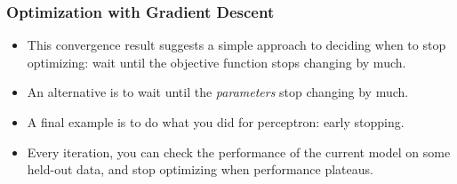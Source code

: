 \documentclass[trans]{beamer}
\begin{document}

\begin{frame}
  \frametitle{Optimization with Gradient Descent}
\begin{itemize}
\item
This convergence result suggests a simple approach to deciding when to
stop optimizing: wait until the objective function stops changing by
much.  
\item An alternative is to wait until the \emph{parameters} stop
changing by much. 
\item A final example is to do what you did for
perceptron: early stopping.  
\item Every iteration, you can check the
performance of the current model on some held-out data, and stop
optimizing when performance plateaus.
\end{itemize}
\end{frame}
\end{document}
